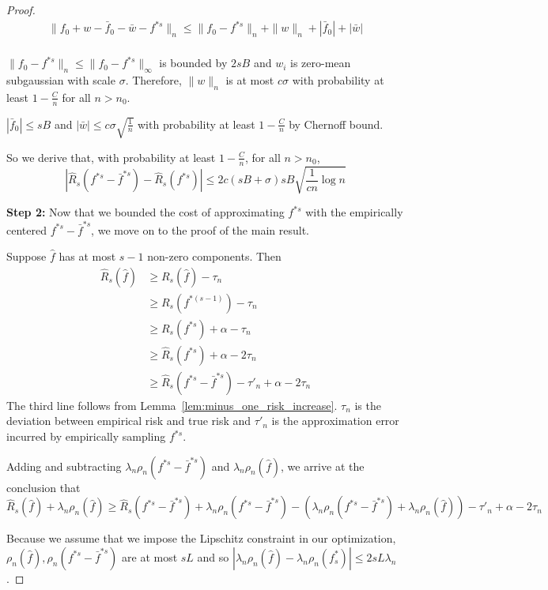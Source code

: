 \begin{proof}
\begin{align*}
\| f_0 + w -\bar{f}_0 - \bar{w} - f^{*s} \|_n 
	\leq \| f_0 - f^{*s} \|_n + \|w\|_n + |\bar{f}_0| + |\bar{w}|\\
\end{align*}

$\|f_0 - f^{*s}\|_n \leq \|f_0 - f^{*s}\|_\infty $ is bounded by $2sB$ and $w_i$ is zero-mean subgaussian with scale $\sigma$. Therefore, $\|w\|_n$ is at most $c\sigma$ with probability at least $1-\frac{C}{n}$ for all $n > n_0$. 

$| \bar{f}_0 | \leq s B$ and $| \bar{w} | \leq c \sigma \sqrt{\frac{1}{n}}$ with probability at least $1-\frac{C}{n}$ by Chernoff bound.

So we derive that, with probability at least $1 -\frac{C}{n}$, for all $n > n_0$,
\[
|\hat{R}_s(f^{*s} - \bar{f}^{*s}) - \hat{R}_s(f^{*s})| \leq 2c (sB+\sigma) sB \sqrt{\frac{1}{cn} \log n}
\]

\textbf{Step 2:} Now that we bounded the cost of approximating $f^{*s}$ with the empirically centered $f^{*s} - \bar{f}^{*s}$, we move on to the proof of the main result.

Suppose $\hat{f}$ has at most $s-1$ non-zero components. Then
\begin{align*}
\hat{R}_s( \hat{f}) &\geq R_s(\hat{f}) - \tau_n \\
	&\geq R_s(f^{*(s-1)}) - \tau_n \\
	&\geq R_s(f^{*s}) + \alpha - \tau_n \\
	&\geq \hat{R}_s(f^{*s}) + \alpha - 2 \tau_n \\
	&\geq \hat{R}_s(f^{*s} - \bar{f}^{*s}) -\tau'_n + \alpha - 2\tau_n 
\end{align*}
The third line follows from Lemma~\ref{lem:minus_one_risk_increase}.
$\tau_n$ is the deviation between empirical risk and true risk and $\tau'_n$ is the approximation error incurred by empirically sampling $f^{*s}$.

Adding and subtracting $ \lambda_n \rho_n(f^{*s} - \bar{f}^{*s})$ and $ \lambda_n \rho_n(\hat{f})$, we arrive at the conclusion that
\[
\hat{R}_s(\hat{f}) + \lambda_n \rho_n(\hat{f}) \geq \hat{R}_s(f^{*s} - \bar{f}^{*s}) + \lambda_n \rho_n(f^{*s} - \bar{f}^{*s}) - ( \lambda_n \rho_n(f^{*s} - \bar{f}^{*s}) + \lambda_n \rho_n(\hat{f}) ) -\tau'_n + \alpha - 2 \tau_n
\]

Because we assume that we impose the Lipschitz constraint in our optimization, $\rho_n(\hat{f}), \rho_n(f^{*s} - \bar{f}^{*s})$ are at most $sL$ and so $|\lambda_n \rho_n(\hat{f}) - \lambda_n \rho_n(f^*_s)| \leq 2 sL \lambda_n$. 



\end{proof}
